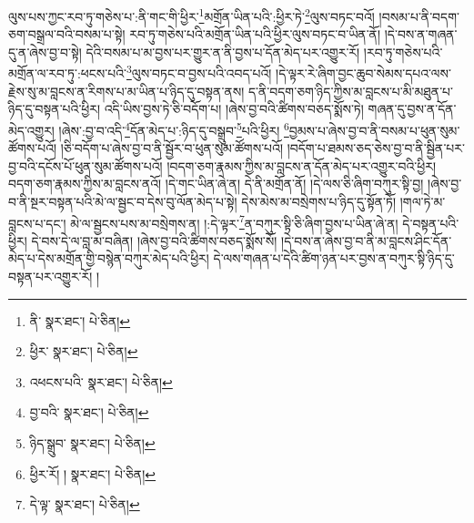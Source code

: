 ལུས་པས་ཀྱང་རབ་ཏུ་གཅེས་པ་:ནི་གང་གི་ཕྱིར་\footnote{ནི་  སྣར་ཐང་།  པེ་ཅིན། }མགྲོན་ཡིན་པའི་:ཕྱིར་ཏེ་\footnote{ཕྱིར་  སྣར་ཐང་།  པེ་ཅིན། }ལུས་བཏང་བའོ། །བསམ་པ་ནི་བདག་ཅག་བསྒྲལ་བའི་བསམ་པ་སྟེ། རབ་ཏུ་གཅེས་པའི་མགྲོན་ཡིན་པའི་ཕྱིར་ལུས་བཏང་བ་ཡིན་ནོ། །དེ་བས་ན་གཞན་དུ་ན་ཞེས་བྱ་བ་སྟེ། དེའི་བསམ་པ་མ་བྱས་པར་གྱུར་ན་ནི་བྱས་པ་དོན་མེད་པར་འགྱུར་རོ། །རབ་ཏུ་གཅེས་པའི་མགྲོན་ལ་རབ་ཏུ་:ཕངས་པའི་\footnote{འཕངས་པའི་  སྣར་ཐང་།  པེ་ཅིན། }ལུས་བཏང་བ་བྱས་པའི་འབད་པའོ། །དེ་ལྟར་རེ་ཞིག་བྱང་ཆུབ་སེམས་དཔའ་ལས་རྗེས་སུ་མ་བླངས་ན་རིགས་པ་མ་ཡིན་པ་ཉིད་དུ་བསྟན་ནས། ད་ནི་བདག་ཅག་ཉིད་ཀྱིས་མ་བླངས་པ་མི་མཐུན་པ་ཉིད་དུ་བསྟན་པའི་ཕྱིར། འདི་ཡིས་བྱས་ཏེ་ཅི་བདོག་པ། །ཞེས་བྱ་བའི་ཚིགས་བཅད་སྨོས་ཏེ། གཞན་དུ་བྱས་ན་དོན་མེད་འགྱུར། །ཞེས་:བྱ་བ་འདི་\footnote{བྱ་བའི་  སྣར་ཐང་།  པེ་ཅིན། }དོན་མེད་པ་:ཉིད་དུ་བསྒྲུབ་\footnote{ཉིད་སྒྲུབ་  སྣར་ཐང་།  པེ་ཅིན། }པའི་ཕྱིར། \footnote{ཕྱིར་རོ། །   སྣར་ཐང་།  པེ་ཅིན། }བྱམས་པ་ཞེས་བྱ་བ་ནི་བསམ་པ་ཕུན་སུམ་ཚོགས་པའོ། །ཅི་བདོག་པ་ཞེས་བྱ་བ་ནི་སྦྱོར་བ་ཕུན་སུམ་ཚོགས་པའོ། །བདོག་པ་ཐམས་ཅད་ཅེས་བྱ་བ་ནི་སྦྱིན་པར་བྱ་བའི་དངོས་པོ་ཕུན་སུམ་ཚོགས་པའོ། །བདག་ཅག་རྣམས་ཀྱིས་མ་བླངས་ན་དོན་མེད་པར་འགྱུར་བའི་ཕྱིར། བདག་ཅག་རྣམས་ཀྱིས་མ་བླངས་ནའོ། །དེ་གང་ཡིན་ཞེ་ན། དེ་ནི་མགྲོན་ནོ། །དེ་ལས་ཅི་ཞིག་བཀུར་སྟི་བྱ། །ཞེས་བྱ་བ་ནི་སྔར་བསྟན་པའི་མེ་ལ་སྦྱང་བ་དེས་བུ་ལོན་མེད་པ་སྟེ། དེས་མེས་མ་བསྲེགས་པ་ཉིད་དུ་སྟོན་ཏོ། །གལ་ཏེ་མ་བླངས་པ་དང་། མེ་ལ་སྦྱངས་པས་མ་བསྲེགས་ན། །:དེ་ལྟར་\footnote{དེ་ལྟ་  སྣར་ཐང་།  པེ་ཅིན། }ན་བཀུར་སྟི་ཅི་ཞིག་བྱས་པ་ཡིན་ཞེ་ན། དེ་བསྟན་པའི་ཕྱིར། དེ་བས་དེ་ལ་བླ་མ་བཞིན། །ཞེས་བྱ་བའི་ཚིགས་བཅད་སྨོས་སོ། །དེ་བས་ན་ཞེས་བྱ་བ་ནི་མ་བླངས་ཤིང་དོན་མེད་པ་དེས་མགྲོན་གྱི་བསྙེན་བཀུར་མེད་པའི་ཕྱིར། དེ་ལས་གཞན་པ་དེའི་ཚིག་ཉན་པར་བྱས་ན་བཀུར་སྟི་ཉིད་དུ་བསྟན་པར་འགྱུར་རོ། །
